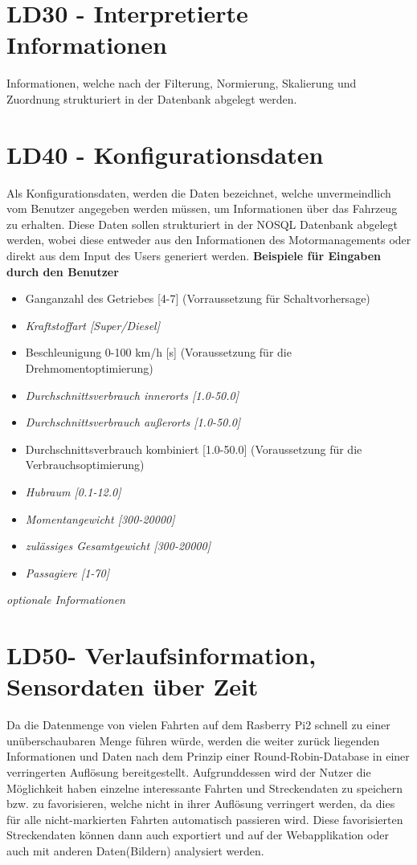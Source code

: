 \section{LD30 - Interpretierte Informationen}
Informationen, welche nach der Filterung, Normierung, Skalierung und Zuordnung strukturiert in der Datenbank abgelegt werden.

\section{LD40 - Konfigurationsdaten}
Als Konfigurationsdaten, werden die Daten bezeichnet, welche unvermeindlich vom Benutzer angegeben werden müssen, um Informationen über das Fahrzeug zu erhalten.   Diese Daten sollen strukturiert in der NOSQL Datenbank abgelegt werden, wobei diese entweder aus den Informationen des Motormanagements oder direkt aus dem Input des Users generiert werden.
\nextline
\textbf{Beispiele für Eingaben durch den Benutzer}
\begin{itemize}
	\item Ganganzahl des Getriebes [4-7] (Vorraussetzung für Schaltvorhersage)
	\item \textit{Kraftstoffart [Super/Diesel]}
	\item Beschleunigung 0-100 km/h [s] (Voraussetzung für die Drehmomentoptimierung)
	\item \textit{Durchschnittsverbrauch innerorts [1.0-50.0]} 
	\item \textit{Durchschnittsverbrauch außerorts [1.0-50.0]}	
	\item Durchschnittsverbrauch kombiniert [1.0-50.0] (Voraussetzung für die Verbrauchsoptimierung)
	\item \textit{Hubraum [0.1-12.0]}
	\item \textit{Momentangewicht [300-20000]}
	\item \textit{zulässiges Gesamtgewicht [300-20000]}
	\item \textit{Passagiere [1-70]}
\end{itemize}
\textit{optionale Informationen}

\section{LD50- Verlaufsinformation, Sensordaten über Zeit}
Da die Datenmenge von vielen Fahrten auf dem Rasberry Pi2 schnell zu einer unüberschaubaren Menge führen würde, werden die weiter zurück liegenden Informationen und Daten nach dem Prinzip einer Round-Robin-Database in einer verringerten Auflösung bereitgestellt. 
Aufgrunddessen wird der Nutzer die Möglichkeit haben einzelne interessante Fahrten und Streckendaten zu speichern bzw. zu favorisieren, welche nicht in ihrer Auflösung verringert werden, da dies für alle nicht-markierten Fahrten automatisch passieren wird. Diese favorisierten Streckendaten können dann auch exportiert und auf der Webapplikation oder auch mit anderen Daten(Bildern) analysiert werden.

